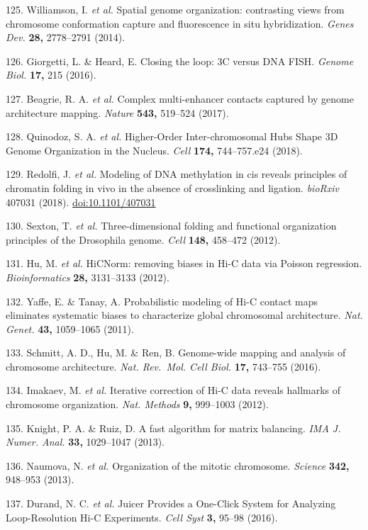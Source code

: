 \documentclass[11pt,twoside]{MPIthesis}
\theoremstyle{definition}
\theoremstyle{definition}
\theoremstyle{definition}
\theoremstyle{remark}
\begin{document}
125. Williamson, I. \emph{et al.} Spatial genome organization:
contrasting views from chromosome conformation capture and fluorescence
in situ hybridization. \emph{Genes Dev.} \textbf{28,} 2778--2791 (2014).

126. Giorgetti, L. \& Heard, E. Closing the loop: 3C versus DNA FISH.
\emph{Genome Biol.} \textbf{17,} 215 (2016).

127. Beagrie, R. A. \emph{et al.} Complex multi-enhancer contacts
captured by genome architecture mapping. \emph{Nature} \textbf{543,}
519--524 (2017).

128. Quinodoz, S. A. \emph{et al.} Higher-Order Inter-chromosomal Hubs
Shape 3D Genome Organization in the Nucleus. \emph{Cell} \textbf{174,}
744--757.e24 (2018).

129. Redolfi, J. \emph{et al.} Modeling of DNA methylation in cis
reveals principles of chromatin folding in vivo in the absence of
crosslinking and ligation. \emph{bioRxiv} 407031 (2018).
\url{doi:10.1101/407031}

130. Sexton, T. \emph{et al.} Three-dimensional folding and functional
organization principles of the Drosophila genome. \emph{Cell}
\textbf{148,} 458--472 (2012).

131. Hu, M. \emph{et al.} HiCNorm: removing biases in Hi-C data via
Poisson regression. \emph{Bioinformatics} \textbf{28,} 3131--3133
(2012).

132. Yaffe, E. \& Tanay, A. Probabilistic modeling of Hi-C contact maps
eliminates systematic biases to characterize global chromosomal
architecture. \emph{Nat. Genet.} \textbf{43,} 1059--1065 (2011).

133. Schmitt, A. D., Hu, M. \& Ren, B. Genome-wide mapping and analysis
of chromosome architecture. \emph{Nat. Rev.~Mol. Cell Biol.}
\textbf{17,} 743--755 (2016).

134. Imakaev, M. \emph{et al.} Iterative correction of Hi-C data reveals
hallmarks of chromosome organization. \emph{Nat. Methods} \textbf{9,}
999--1003 (2012).

135. Knight, P. A. \& Ruiz, D. A fast algorithm for matrix balancing.
\emph{IMA J. Numer. Anal.} \textbf{33,} 1029--1047 (2013).

136. Naumova, N. \emph{et al.} Organization of the mitotic chromosome.
\emph{Science} \textbf{342,} 948--953 (2013).

137. Durand, N. C. \emph{et al.} Juicer Provides a One-Click System for
Analyzing Loop-Resolution Hi-C Experiments. \emph{Cell Syst} \textbf{3,}
95--98 (2016).
\end{document}
